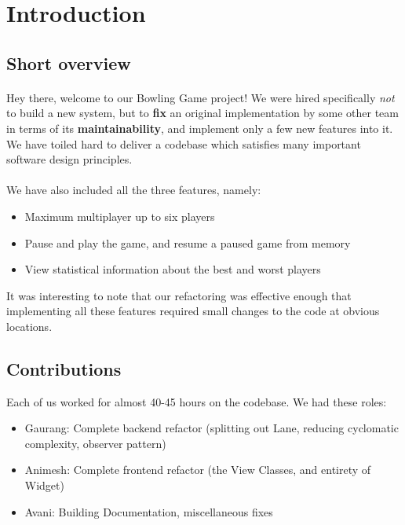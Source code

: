 \section{Introduction}

\subsection{Short overview}

\paragraph{} Hey there, welcome to our Bowling Game project! We were hired specifically \textit{not} to build a new system, but to \textbf{fix} an original implementation by some other team in terms of its \textbf{maintainability}, and implement only a few new features into it. We have toiled hard to deliver a codebase which satisfies many important software design principles.
\paragraph{} We have also included all the three features, namely:
\begin{itemize}
    \item Maximum multiplayer up to six players
    \item Pause and play the game, and resume a paused game from memory
    \item View statistical information about the best and worst players
\end{itemize}

It was interesting to note that our refactoring was effective enough that implementing all these features required small changes to the code at obvious locations.

\subsection{Contributions}

Each of us worked for almost 40-45 hours on the codebase. We had these roles:

\begin{itemize}
    \item Gaurang: Complete backend refactor (splitting out Lane, reducing cyclomatic complexity, observer pattern)
    \item Animesh: Complete frontend refactor (the View Classes, and entirety of Widget)
    \item Avani: Building Documentation, miscellaneous fixes
\end{itemize}